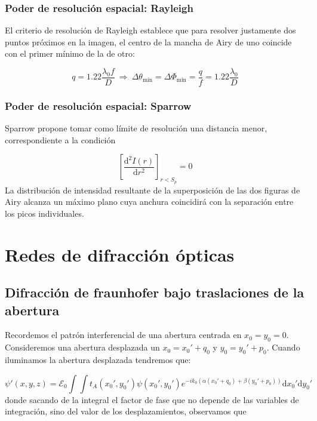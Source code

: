\documentclass[12pt,a4paper]{book}
\numberwithin{equation}{section}
\numberwithin{figure}{section}
\newcommand{\ccorchetes}[1]{\left[ #1  \right]}
\newcommand{\D}{\mathrm{d}}
\newcommand{\derivadas}[2]{\frac{\D #1}{\D #2}}
\newcommand{\1}{_{(1)}}
\newcommand{\2}{_{(2)}}
\newcommand{\Ecal}{\mathcal{E}}
\theoremstyle{definition}
\begin{document}
\subsubsection{Poder de resolución espacial: Rayleigh}

El criterio de resolución de Rayleigh establece que para resolver justamente dos puntos próximos en la imagen, el centro de la mancha de Airy de uno coincide con el primer mínimo de la de otro:

\begin{equation}
    q = 1.22 \frac{\lambda_0 f}{D} \ \Rightarrow \ \Delta \theta_{\min} = \Delta \Phi_{\min} = \frac{q}{f} = 1.22 \frac{\lambda_0}{D}
\end{equation}

\subsubsection{Poder de resolución espacial: Sparrow}

Sparrow propone tomar como límite de resolución una distancia menor, correspondiente a la condición

\begin{equation}
    \ccorchetes{\derivadas{^2 I(r)}{r^2}}_{r<S_p} = 0
\end{equation}
La distribución de intensidad resultante de la superposición de las dos figuras de Airy alcanza un máximo plano cuya anchura coincidirá con la separación entre los picos individuales. 

\section{Redes de difracción ópticas}

\subsection{Difracción de fraunhofer bajo traslaciones de la abertura}

Recordemos el patrón interferencial de una abertura centrada en $x_0=y_0=0$. Consideremos una abertura desplazada un $x_0=x_0'+q_0$ y $y_0=y_0'+p_0$. Cuando iluminamos la abertura desplazada tendremos que:

\begin{equation}
    \psi'(x,y,z) = \Ecal_0 \int \int t_A (x_0',y_0') \psi (x_0',y_0') e^{-ik_0 (\alpha (x_0'+q_0)+\beta(y_0'+p_0))} \D x_0' \D y_0'
\end{equation}
donde sacando de la integral el factor de fase que no depende de las variables de integración, sino del valor de los desplazamientos, observamos que 
\end{document}
